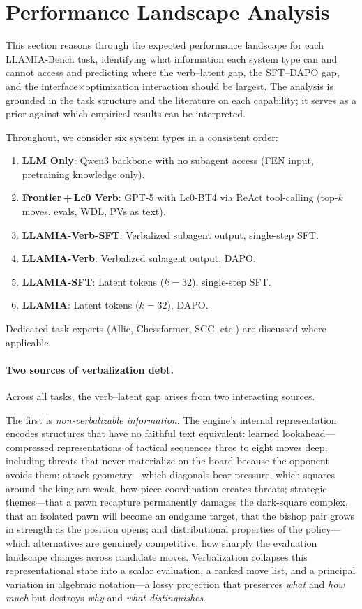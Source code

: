 \section{Performance Landscape Analysis}
\label{sec:app_landscape}

This section reasons through the expected performance landscape for each
LLAMIA-Bench task, identifying what information each system type can and
cannot access and predicting where the verb--latent gap, the SFT--DAPO gap,
and the interface$\times$optimization interaction should be largest.
The analysis is grounded in the task structure and the literature on each
capability; it serves as a prior against which empirical results can be
interpreted.

Throughout, we consider six system types in a consistent order:

\begin{enumerate}[leftmargin=*, itemsep=1pt, topsep=2pt]
  \item \textbf{LLM Only}: Qwen3 backbone with no subagent access (FEN input, pretraining knowledge only).
  \item \textbf{Frontier\,+\,Lc0 Verb}: GPT-5 with Lc0-BT4 via ReAct tool-calling (top-$k$ moves, evals, WDL, PVs as text).
  \item \textbf{LLAMIA-Verb-SFT}: Verbalized subagent output, single-step SFT.
  \item \textbf{LLAMIA-Verb}: Verbalized subagent output, DAPO.
  \item \textbf{LLAMIA-SFT}: Latent tokens ($k{=}32$), single-step SFT.
  \item \textbf{LLAMIA}: Latent tokens ($k{=}32$), DAPO.
\end{enumerate}

\noindent Dedicated task experts (Allie, Chessformer, SCC, etc.) are discussed
where applicable.

\paragraph{Two sources of verbalization debt.}
Across all tasks, the verb--latent gap arises from two interacting sources.

The first is \emph{non-verbalizable information}.
The engine's internal representation encodes structures that have no faithful
text equivalent: learned lookahead---compressed representations of tactical
sequences three to eight moves deep, including threats that never materialize
on the board because the opponent avoids them; attack geometry---which
diagonals bear pressure, which squares around the king are weak, how piece
coordination creates threats; strategic themes---that a pawn recapture
permanently damages the dark-square complex, that an isolated pawn will become
an endgame target, that the bishop pair grows in strength as the position
opens; and distributional properties of the policy---which alternatives are
genuinely competitive, how sharply the evaluation landscape changes across
candidate moves.
Verbalization collapses this representational state into a scalar evaluation,
a ranked move list, and a principal variation in algebraic notation---a lossy
projection that preserves \emph{what} and \emph{how much} but destroys
\emph{why} and \emph{what distinguishes}.

